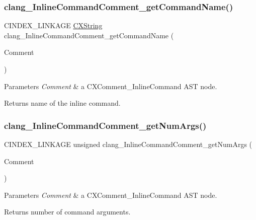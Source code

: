 \subsubsection{\texorpdfstring{clang\+\_\+\+Inline\+Command\+Comment\+\_\+get\+Command\+Name()}{clang\_InlineCommandComment\_getCommandName()}}
{\footnotesize\ttfamily C\+I\+N\+D\+E\+X\+\_\+\+L\+I\+N\+K\+A\+GE \hyperlink{structCXString}{C\+X\+String} clang\+\_\+\+Inline\+Command\+Comment\+\_\+get\+Command\+Name (\begin{DoxyParamCaption}\item[{\hyperlink{structCXComment}{C\+X\+Comment}}]{Comment }\end{DoxyParamCaption})}


\begin{DoxyParams}{Parameters}
{\em Comment} & a {\ttfamily C\+X\+Comment\+\_\+\+Inline\+Command} A\+ST node.\\
\hline
\end{DoxyParams}
\begin{DoxyReturn}{Returns}
name of the inline command. 
\end{DoxyReturn}
\mbox{\label{group__CINDEX__COMMENT_ga78db1049239be9649c2829cdeb83c544}} 
\subsubsection{\texorpdfstring{clang\+\_\+\+Inline\+Command\+Comment\+\_\+get\+Num\+Args()}{clang\_InlineCommandComment\_getNumArgs()}}
{\footnotesize\ttfamily C\+I\+N\+D\+E\+X\+\_\+\+L\+I\+N\+K\+A\+GE unsigned clang\+\_\+\+Inline\+Command\+Comment\+\_\+get\+Num\+Args (\begin{DoxyParamCaption}\item[{\hyperlink{structCXComment}{C\+X\+Comment}}]{Comment }\end{DoxyParamCaption})}


\begin{DoxyParams}{Parameters}
{\em Comment} & a {\ttfamily C\+X\+Comment\+\_\+\+Inline\+Command} A\+ST node.\\
\hline
\end{DoxyParams}
\begin{DoxyReturn}{Returns}
number of command arguments. 
\end{DoxyReturn}
\mbox{\label{group__CINDEX__COMMENT_ga3dd54ce1288d09c408cac8c887da2ebd}} 
